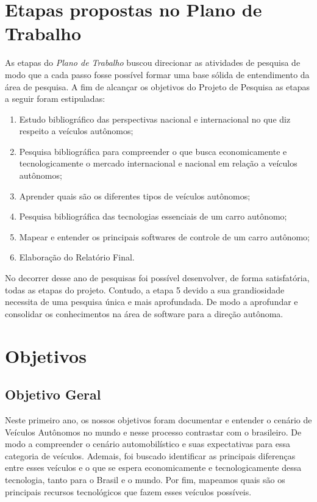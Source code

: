 
\chapter{Etapas propostas no Plano de Trabalho} \label{Etapas}
As etapas do \textit{Plano de Trabalho} buscou direcionar as atividades de pesquisa de modo que a cada passo fosse possível formar uma base sólida de entendimento da área de pesquisa. A fim de alcançar os objetivos do Projeto de Pesquisa as etapas a seguir foram estipuladas:
\begin{enumerate}
    \item  Estudo bibliográfico das perspectivas nacional e internacional no que diz respeito a veículos autônomos;
    \item  Pesquisa bibliográfica para compreender o que busca economicamente e tecnologicamente o mercado internacional e nacional em relação a veículos autônomos;
    \item Aprender quais são os diferentes tipos de veículos autônomos;
    \item Pesquisa bibliográfica das tecnologias essenciais de um carro autônomo;
    \item Mapear e entender os principais softwares de controle de um carro autônomo;
    \item Elaboração do Relatório Final.
\end{enumerate}

No decorrer desse ano de pesquisas foi possível desenvolver, de forma satisfatória, todas as etapas do projeto. Contudo, a etapa 5 devido a sua grandiosidade necessita de uma pesquisa única e mais aprofundada. De modo a aprofundar e consolidar os conhecimentos na área de software para a direção autônoma.

\newpage
\chapter{Objetivos} \label{Objetivos}
\section{Objetivo Geral}\label{Objetivo Geral}
Neste primeiro ano, os nossos objetivos foram documentar e entender o cenário de Veículos Autônomos no mundo e nesse processo contrastar com o brasileiro. De modo a compreender o cenário automobilístico e suas expectativas para essa categoria de veículos. Ademais, foi buscado identificar as principais diferenças entre esses veículos e o que se espera economicamente e tecnologicamente dessa tecnologia, tanto para o Brasil e o mundo. Por fim, mapeamos quais são os principais recursos tecnológicos que fazem esses veículos possíveis. 

